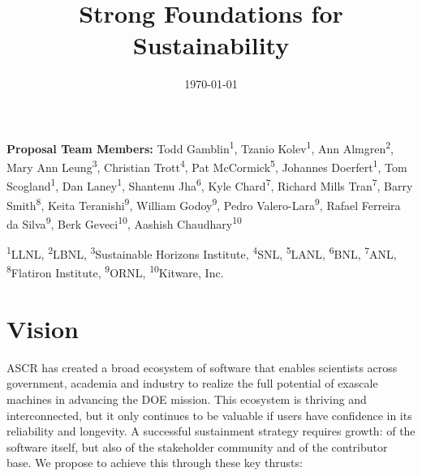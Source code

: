 \documentclass[11pt]{article}
\title{\vspace{-3em}\sf\huge\color{secblue}%
Strong Foundations for Sustainability}
\date{\vspace{-4em}\footnotesize\today\vspace{-3em}}
\begin{document}
\setcounter{page}{1}

\maketitle

{\footnotesize
{\bf Proposal Team Members:}
  Todd Gamblin\textsuperscript{1},
  Tzanio Kolev\textsuperscript{1},
  Ann Almgren\textsuperscript{2},
  Mary Ann Leung\textsuperscript{3},
  Christian Trott\textsuperscript{4},
  Pat McCormick\textsuperscript{5},
  Johannes Doerfert\textsuperscript{1},
  Tom Scogland\textsuperscript{1},
  Dan Laney\textsuperscript{1},
  Shantenu Jha\textsuperscript{6},
  Kyle Chard\textsuperscript{7},
  Richard Mills Tran\textsuperscript{7},
  Barry Smith\textsuperscript{8},
  Keita Teranishi\textsuperscript{9},
  William Godoy\textsuperscript{9},
  Pedro Valero-Lara\textsuperscript{9},
  Rafael Ferreira da Silva\textsuperscript{9},
  Berk Geveci\textsuperscript{10},
  Aashish Chaudhary\textsuperscript{10}

  \textsuperscript{1}LLNL,
  \textsuperscript{2}LBNL,
  \textsuperscript{3}Sustainable Horizons Institute,
  \textsuperscript{4}SNL,
  \textsuperscript{5}LANL,
  \textsuperscript{6}BNL,
  \textsuperscript{7}ANL,
  \textsuperscript{8}Flatiron Institute,
  \textsuperscript{9}ORNL,
  \textsuperscript{10}Kitware, Inc.

}

\section{Vision}

ASCR has created a broad ecosystem of software that
enables scientists across government, academia and industry to realize the full
potential of exascale machines in advancing the DOE mission.
This ecosystem is thriving and interconnected,
but it only continues to be
valuable if users have confidence in its reliability and longevity.
A successful sustainment strategy requires growth: of the software itself,
but also of the stakeholder community and of the contributor base.
We propose to achieve this through these key thrusts:
\end{document}
